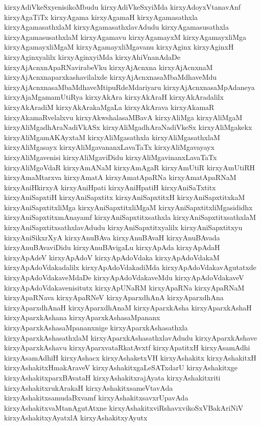 {kirxyAdiVkeSxyenisikoMbudu
kirxyAdiVkeSxyiMda
kirxyAdoyxVtanavAnf
kirxyAgaTiTx
kirxyAgama
kirxyAgamaH
kirxyAgamasathxla
kirxyAgamasathxlaM
kirxyAgamasathxlavAdudu
kirxyAgamasusathxla
kirxyAgamasusathxlaM
kirxyAgamavu
kirxyAgamayxM
kirxyAgamayxliMga
kirxyAgamayxliMgaM
kirxyAgamayxliMgavanu
kirxyAginx
kirxyAginxH
kirxyAginxyalilx
kirxyAginxyiMda
kirxyAhiVnanAdaDe
kirxyAjAcnxnApaRNavirabeVku
kirxyAjAcnxna
kirxyAjAcnxnaM
kirxyAjAcnxnaparxkashavilalxde
kirxyAjAcnxnasaMbaMdhaveMdu
kirxyAjAcnxnasaMbaMdhaveMtipuRdeMdariyaru
kirxyAjAcnxnasaMpAdaneya
kirxyAjaMgamamUtiRya
kirxyAkAra
kirxyAkAraH
kirxyAkAradalilx
kirxyAkAradiM
kirxyAkArakaMgaLa
kirxyAkArava
kirxyAkamaR
kirxyAkamaRvelalxvu
kirxyAkwshalasaMBavA
kirxyAliMga
kirxyAliMgaM
kirxyAliMgadhAraNadiVkASx
kirxyAliMgadhAraNadiVkeSx
kirxyAliMgakekx
kirxyAliMgamAKAyxtaM
kirxyAliMgasathxla
kirxyAliMgasathxlaM
kirxyAliMgasayx
kirxyAliMgavananxLavaTaTx
kirxyAliMgavayayx
kirxyAliMgavenisi
kirxyAliMgaviDidu
kirxyAliMgavinanxLavaTaTx
kirxyAliMgoVdaR
kirxyAmANaM
kirxyAmAgaR
kirxyAmUtiR
kirxyAmUtiRH
kirxyAmaMtarxva
kirxyAmatA
kirxyAmatApaRNa
kirxyAmatApaRNaM
kirxyAniHkirxyA
kirxyAniHpati
kirxyAniHpatiH
kirxyAniSaTxtitx
kirxyAniSapxtiH
kirxyAniSapxtitx
kirxyAniSapxtitxH
kirxyAniSapxtitxkaM
kirxyAniSapxtitxliMga
kirxyAniSapxtitxliMgaM
kirxyAniSapxtitxliMgasididhx
kirxyAniSapxtitxmAnayamf
kirxyAniSapxtitxsathxla
kirxyAniSapxtitxsathxlaM
kirxyAniSapxtitxsathxlavAdudu
kirxyAniSapxtitxyalilx
kirxyAniSapxtitxyu
kirxyAniSikxrXyA
kirxyAnuBAva
kirxyAnuBAvaH
kirxyAnuBAvada
kirxyAnuBAvaviDidu
kirxyAnuBAvigaLu
kirxyApAda
kirxyApAdaH
kirxyApAdeV
kirxyApAdoV
kirxyApAdoVdaka
kirxyApAdoVdakaM
kirxyApAdoVdakadalilx
kirxyApAdoVdakadiMda
kirxyApAdoVdakavAgutatxde
kirxyApAdoVdakaveMdaDe
kirxyApAdoVdakaveMdu
kirxyApAdoVdakaveV
kirxyApAdoVdakavenisitutx
kirxyApUNaRM
kirxyApaRNa
kirxyApaRNaM
kirxyApaRNava
kirxyApaRNeV
kirxyAparxdhAnA
kirxyAparxdhAna
kirxyAparxdhAnaH
kirxyAparxdhAnaM
kirxyAparxkAsha
kirxyAparxkAshaH
kirxyAparxkAshana
kirxyAparxkAshasaMpananx
kirxyAparxkAshasaMpananxnige
kirxyAparxkAshasathxla
kirxyAparxkAshasathxlaM
kirxyAparxkAshasathxlavAdudu
kirxyAparxkAshave
kirxyAparxkAshavu
kirxyAparxvataRkatAvxtf
kirxyApatitxH
kirxyAsamAdhi
kirxyAsamAdhiH
kirxyAshacx
kirxyAshaketxVH
kirxyAshakitx
kirxyAshakitxH
kirxyAshakitxHmakAraveV
kirxyAshakitxgaLeSATxdarU
kirxyAshakitxge
kirxyAshakitxparxBAvataH
kirxyAshakitxrajAyata
kirxyAshakitxriti
kirxyAshakitxrukArakaH
kirxyAshakitxsameVtavAda
kirxyAshakitxsamudaBxvamf
kirxyAshakitxsavxrUpavAda
kirxyAshakitxvaMtanAgutAtxne
kirxyAshakitxviRshavxvikoSxVBakAriNiV
kirxyAshakitxyAyatxlA
kirxyAshakitxyAyutx
}
